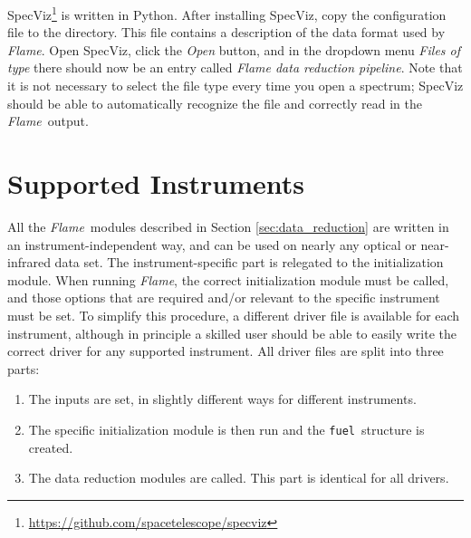 \documentclass[a4paper]{article}
\newcommand{\flame}{\emph{Flame}}
\newcommand{\fuel}{\texttt{fuel}}
\begin{document}
\begin{sloppypar}
SpecViz\footnote{\url{https://github.com/spacetelescope/specviz}} is written in Python. After installing SpecViz, copy the configuration file  to the  directory. This file contains a description of the data format used by \flame. Open SpecViz, click the \emph{Open} button, and in the dropdown menu \emph{Files of type} there should now be an entry called \emph{Flame data reduction pipeline}. Note that it is not necessary to select the file type every time you open a spectrum; SpecViz should be able to automatically recognize the file and correctly read in the \flame\ output.







\section{Supported Instruments}
\label{sec:instruments}

All the \flame\ modules described in Section \ref{sec:data_reduction} are written in an instrument-independent way, and can be used on nearly any optical or near-infrared data set. The instrument-specific part is relegated to the initialization module. When running \flame, the correct initialization module must be called, and those options that are required and/or relevant to the specific instrument must be set. To simplify this procedure, a different driver file is available for each instrument, although in principle a skilled user should be able to easily write the correct driver for any supported instrument. All driver files are split into three parts:
\begin{enumerate}
  \item The inputs are set, in slightly different ways for different instruments.
  \item The specific initialization module is then run and the \fuel\ structure is created.
  \item The data reduction modules are called. This part is identical for all drivers.
\end{enumerate}


\end{sloppypar}
\end{document}
